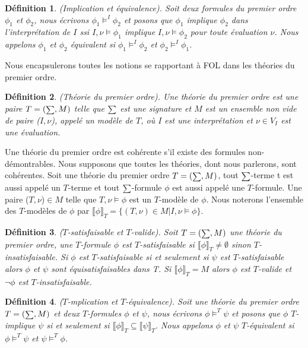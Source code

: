\documentclass[11pt,openany]{article}
\newcommand\phibra{\llbracket\phi\rrbracket}
\newcommand\psibra{\llbracket\psi\rrbracket}
\newtheorem{definition}{D\'efinition}[subsection]
\begin{document}
\begin{definition}
(Implication et \'equivalence). Soit deux formules du premier ordre $\phi_{1}$ et $\phi_{2}$, nous \'ecrivons $\phi_{1}\models^{I}\phi_{2}$ et posons que $\phi_{1}$ implique $\phi_{2}$ dans l'interpr\'etation de $I$ ssi $I,\nu\models\phi_{1}$ implique $I,\nu\models\phi_{2}$ pour toute \'evaluation $\nu$. Nous appelons $\phi_{1}$  et $\phi_{2}$  \'equivalent si $\phi_{1}\models^{I}\phi_{2}$ et $\phi_{2}\models^{I}\phi_{1}$.
\end{definition}\par
Nous encapsulerons toutes les notions se rapportant \`a FOL dans les th\'eories du premier ordre.

\begin{definition}
(Th\'eorie du premier ordre). Une th\'eorie du premier ordre est une paire $T=(\mathsmaller \sum,M)$ telle que $\mathsmaller \sum$ est une signature et $M$ est un ensemble non vide de paire ($I,\nu$), appel\'e un mod\`ele de $T$, o\`u $I$ est une interpr\'etation et $\nu\in V_{I}$ est une \'evaluation.
\end{definition}

Une th\'eorie du premier ordre est coh\'erente s'il existe des formules non-d\'emontrables. Nous supposons que toutes les th\'eories, dont nous parlerons, sont coh\'erentes. Soit une th\'eorie du premier ordre $T = (\mathsmaller \sum,M)$, tout $\mathsmaller \sum$-terme t est aussi appel\'e un $T$-terme et tout $\mathsmaller \sum$-formule $\phi$ est aussi appel\'e une $T$-formule. Une paire ($T,\nu$)$\in M$ telle que $T,\nu\models\phi$ est un $T$-mod\`ele de $\phi$. Nous noterons l'ensemble des $T$-mod\`eles de $\phi$ par $\phibra_{T} = \{(T,\nu)\in M | I,\nu\models\phi\}$.

\begin{definition}
($T$-satisfaisable et $T$-valide). Soit $T = (\mathsmaller\sum,M)$ une th\'eorie du premier ordre, une $T$-formule $\phi$ est $T$-satisfaisable si $\phibra_{T} \neq \emptyset$ sinon $T$-insatisfaisable. Si $\phi$ est $T$-satisfaisable si et seulement si $\psi$ est $T$-satisfaisable alors $\phi$ et $\psi$ sont \'equisatisfaisables dans T. Si $\phibra_{T} = M$ alors $\phi$ est $T$-valide et $\neg\phi$ est $T$-insatisfaisable.
\end{definition}

\begin{definition}
($T$-mplication et $T$-\'equivalence). Soit une th\'eorie du premier ordre $T = (\mathsmaller \sum,M)$ et deux $T$-formules $\phi$ et $\psi$, nous \'ecrivons $\phi\models^{T}\psi$ et posons que $\phi$ $T$-implique $\psi$ si et seulement si $\phibra_{T}\subseteq \psibra_{T}$. Nous appelons $\phi$  et $\psi$  $T$-\'equivalent si $\phi\models^{T}\psi$ et $\psi\models^{T}\phi$.
\end{definition}\par
\end{document}
